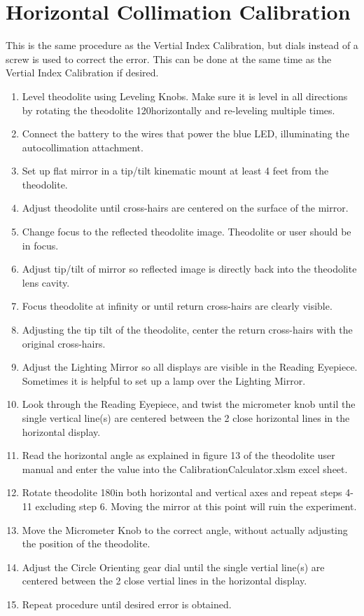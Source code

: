 \documentclass[a4paper,12pt]{article}
\begin{document}
\section*{Horizontal Collimation Calibration}
    This is the same procedure as the Vertial Index Calibration, but dials instead of a screw is used to correct the error. This can be done at the same time as the Vertial Index Calibration if desired.
    \begin{enumerate}
    \item Level theodolite using Leveling Knobs. Make sure it is level in all directions by rotating the theodolite 120\degree horizontally and re-leveling multiple times.
	\item Connect the battery to the wires that power the blue LED, illuminating the autocollimation attachment.
	\item Set up flat mirror in a tip/tilt kinematic mount  at least 4 feet from the theodolite.
	\item Adjust theodolite until cross-hairs are centered on the surface of the mirror.
	\item Change focus to the reflected theodolite image. Theodolite or user should be in focus.
	\item Adjust tip/tilt of mirror so reflected image is directly back into the theodolite lens cavity.
	\item Focus theodolite at infinity or until return cross-hairs are clearly visible.
	\item Adjusting the tip tilt of the theodolite, center the return cross-hairs with the original cross-hairs.
	\item Adjust the Lighting Mirror so all displays are visible in the Reading Eyepiece. Sometimes it is helpful to set up a lamp over the Lighting Mirror.
	\item Look through the Reading Eyepiece, and twist the micrometer knob until the single vertical line(s) are centered between the 2 close horizontal lines in the horizontal display.
	\item Read the horizontal angle as explained in figure 13 of the theodolite user manual and enter the value into the CalibrationCalculator.xlsm excel sheet.
	\item Rotate theodolite 180\degree in both horizontal and vertical axes and repeat steps 4-11 excluding step 6. Moving the mirror at this point will ruin the experiment.
	\item Move the Micrometer Knob to the correct angle, without actually adjusting the position of the theodolite.
	\item Adjust the Circle Orienting gear dial until the single vertial line(s) are centered between the 2 close vertial lines in the horizontal display.
	\item Repeat procedure until desired error is obtained.
    \end{enumerate}
\end{document}
